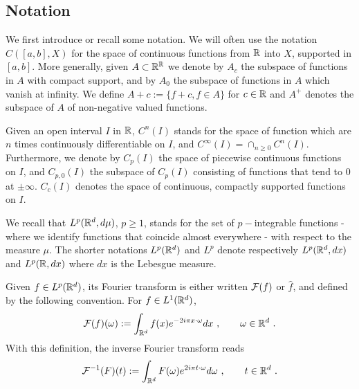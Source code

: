 \subsection{Notation}

We first introduce or recall some notation. We will often use the notation $C([a,b],X)$ for the space of continuous functions from $\mathbb{R}$ into $X$, supported  in $[a,b]$. More generally, given $A\subset \mathbb{R}^{\mathbb{R}}$ we denote by $A_c$ the subspace of functions in $A$ with compact support, and by $A_0$ the subspace of functions in $A$ which vanish at infinity. We define $A+c:=\{f+c, f\in A\}$ for $c\in\mathbb{R}$ and $A^+$ denotes the subspace of $A$ of non-negative valued functions.

Given an open interval $I$ in $\mathbb{R}$, $C^n(I)$ stands for the space of function which are $n$ times continuously differentiable on $I$, and $C^\infty(I) = \cap_{n\geqslant 0} C^n(I)$. Furthermore, we denote  by $C_p(I)$ the space of piecewise continuous functions on $I$, and $C_{p,0}(I)$ the subspace of $C_p(I)$ consisting of functions that tend to 0 at $\pm\infty$. $C_c(I)$ denotes the space of continuous, compactly supported functions on $I$.

We recall that $L^p(\mathbb{R}^d,d\mu)$, $p\geqslant1$, stands for the set of $p-$integrable functions - where we identify functions that coincide almost everywhere - with respect to the measure $\mu$. The shorter notations $L^p(\mathbb{R}^d)$ and $L^p$ denote respectively $L^p(\mathbb{R}^d,dx)$ and $L^p(\mathbb{R},dx)$ where $dx$ is the Lebesgue measure.


Given $f\in L^p(\mathbb{R}^d)$, its Fourier transform is either written $\mathcal{F}(f)$ or $\hat{f}$, and defined by the following convention.  For $f\in L^1(\mathbb{R}^d)$,
\begin{equation}
    \mathcal{F}(f)(\omega) := \int_{\mathbb{R}^d} f(x)e^{-2i\pi x\cdot\omega} dx\ ,\qquad\omega\in\mathbb{R}^d\ .
\end{equation}
With this definition, the inverse Fourier transform reads
\begin{equation}
\mathcal{F}^{-1}(F)(t):= \int_{\mathbb{R}^d}F(\omega)e^{2i\pi t\cdot \omega}d\omega\ , \qquad t\in\mathbb{R}^d\ .
\end{equation}


